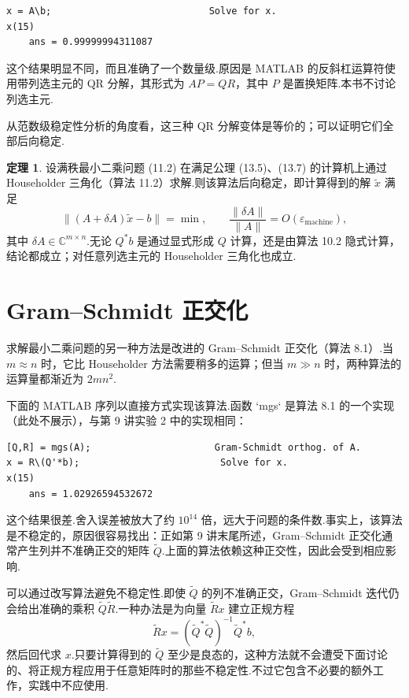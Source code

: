 \documentclass[UTF8,fontset=none,12pt]{ctexart}
\newcommand{\C}{\mathbb{C}}
\newcommand{\epsmach}{\varepsilon_{\mathrm{machine}}}
\theoremstyle{definition}
\newtheorem{theorem}{定理}
\begin{document}
\begin{verbatim}
x = A\b;                            Solve for x.
x(15)
    ans = 0.99999994311087
\end{verbatim}

这个结果明显不同，而且准确了一个数量级.原因是 MATLAB 的反斜杠运算符使用带列选主元的 QR 分解，其形式为 $AP=QR$，其中 $P$ 是置换矩阵.本书不讨论列选主元.

从范数级稳定性分析的角度看，这三种 QR 分解变体是等价的；可以证明它们全部后向稳定.

\begin{theorem}
设满秩最小二乘问题 (11.2) 在满足公理 (13.5)、(13.7) 的计算机上通过 Householder 三角化（算法 11.2）求解.则该算法后向稳定，即计算得到的解 $\widetilde x$ 满足
\begin{equation}
    \|(A+\delta A)\widetilde x-b\|=\min,
    \qquad \frac{\|\delta A\|}{\|A\|}=O(\epsmach),
    \tag{19.1}
\end{equation}
其中 $\delta A\in\C^{m\times n}$.无论 $Q^*b$ 是通过显式形成 $Q$ 计算，还是由算法 10.2 隐式计算，结论都成立；对任意列选主元的 Householder 三角化也成立.
\end{theorem}

\section*{Gram--Schmidt 正交化}

求解最小二乘问题的另一种方法是改进的 Gram--Schmidt 正交化（算法 8.1）.当 $m\approx n$ 时，它比 Householder 方法需要稍多的运算；但当 $m\gg n$ 时，两种算法的运算量都渐近为 $2mn^2$.

下面的 MATLAB 序列以直接方式实现该算法.函数 `mgs` 是算法 8.1 的一个实现（此处不展示），与第 9 讲实验 2 中的实现相同：

\begin{verbatim}
[Q,R] = mgs(A);                      Gram-Schmidt orthog. of A.
x = R\(Q'*b);                         Solve for x.
x(15)
    ans = 1.02926594532672
\end{verbatim}

这个结果很差.舍入误差被放大了约 $10^{14}$ 倍，远大于问题的条件数.事实上，该算法是不稳定的，原因很容易找出：正如第 9 讲末尾所述，Gram--Schmidt 正交化通常产生列并不准确正交的矩阵 $\widetilde Q$.上面的算法依赖这种正交性，因此会受到相应影响.

可以通过改写算法避免不稳定性.即使 $\widetilde Q$ 的列不准确正交，Gram--Schmidt 迭代仍会给出准确的乘积 $\widetilde Q\widetilde R$.一种办法是为向量 $\widetilde R x$ 建立正规方程
\[
\widetilde R x=(\widetilde Q^*\widetilde Q)^{-1}\widetilde Q^*b,
\]
然后回代求 $x$.只要计算得到的 $\widetilde Q$ 至少是良态的，这种方法就不会遭受下面讨论的、将正规方程应用于任意矩阵时的那些不稳定性.不过它包含不必要的额外工作，实践中不应使用.
\end{document}
